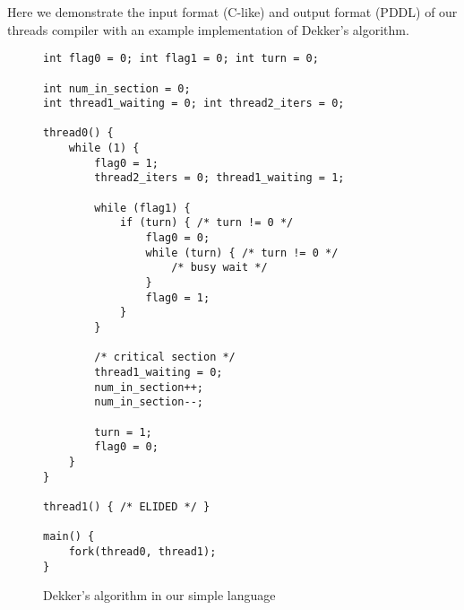 \label{sec:appendix}

Here we demonstrate the input format (C-like) and output format (PDDL) of our threads compiler with an example implementation of Dekker's algorithm.

\begin{figure}[h]
\begin{center}
\begin{verbatim}
int flag0 = 0; int flag1 = 0; int turn = 0;

int num_in_section = 0;
int thread1_waiting = 0; int thread2_iters = 0;

thread0() {
    while (1) {
        flag0 = 1;
        thread2_iters = 0; thread1_waiting = 1;

        while (flag1) {
            if (turn) { /* turn != 0 */
                flag0 = 0;
                while (turn) { /* turn != 0 */
                    /* busy wait */
                }
                flag0 = 1;
            }
        }

        /* critical section */
        thread1_waiting = 0;
        num_in_section++;
        num_in_section--;

        turn = 1;
        flag0 = 0;
    }
}

thread1() { /* ELIDED */ }

main() {
    fork(thread0, thread1);
}
\end{verbatim}
\end{center}
\caption{Dekker's algorithm in our simple language}
\label{fig:dekker-code}
\end{figure}

